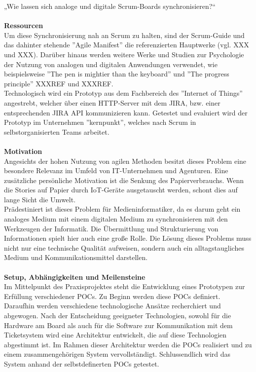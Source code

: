 \documentclass[12pt,titlepage]{scrartcl}
\begin{document}
„Wie lassen sich analoge und digitale Scrum-Boards synchronisieren?“ \\ \\
\textbf{Ressourcen} \\
Um diese Synchronisierung nah an Scrum zu halten, sind der Scrum-Guide und das dahinter stehende ''Agile  Manifest'' die referenzierten Hauptwerke (vgl. XXX und XXX). Darüber hinaus werden weitere Werke und Studien zur Psychologie der Nutzung von analogen und digitalen Anwendungen verwendet, wie beispielsweise ''The pen is mightier than the keyboard'' und ''The progress principle'' XXXREF und XXXREF. \\
Technologisch wird ein Prototyp aus dem Fachbereich des ''Internet of Things'' angestrebt, welcher über einen HTTP-Server mit dem JIRA, bzw. einer entsprechenden JIRA API kommunizieren kann. Getestet und evaluiert wird der Prototyp im Unternehmen ''kernpunkt'', welches nach Scrum in selbstorganisierten Teams arbeitet.\\ \\
\textbf{Motivation} \\
Angesichts der hohen Nutzung von agilen Methoden besitzt dieses Problem eine besondere Relevanz im Umfeld von IT-Unternehmen und Agenturen. Eine zusätzliche persönliche Motivation ist die Senkung des Papierverbrauchs. Wenn die Stories auf Papier durch IoT-Geräte ausgetauscht werden, schont dies auf lange Sicht die Umwelt. \\
Prädestiniert ist dieses Problem für Medieninformatiker, da es darum geht ein analoges Medium mit einem digitalen Medium zu synchronisieren mit den Werkzeugen der Informatik. Die Übermittlung und Strukturierung von Informationen spielt hier auch eine große Rolle. Die Lösung dieses Problems muss nicht nur eine technische Qualität aufweisen, sondern auch ein alltagstaugliches Medium und Kommunikationsmittel darstellen.\\ \\
\textbf{Setup, Abhängigkeiten und Meilensteine} \\
Im Mittelpunkt des Praxisprojektes steht die Entwicklung eines Prototypen zur Erfüllung verschiedener POCs. Zu Beginn werden diese POCs definiert. Daraufhin werden verschiedene technologische Ansätze recherchiert und abgewogen. Nach der Entscheidung geeigneter Technologien, sowohl für die Hardware am Board als auch für die Software zur Kommunikation mit dem Ticketsystem wird eine Architektur entwickelt, die auf diese Technologien abgestimmt ist. Im Rahmen dieser Architektur werden die POCs realisiert und zu einem zusammengehörigen System vervollständigt. Schlussendlich wird das System anhand der selbstdefinerten POCs getestet.\\
\end{document}
